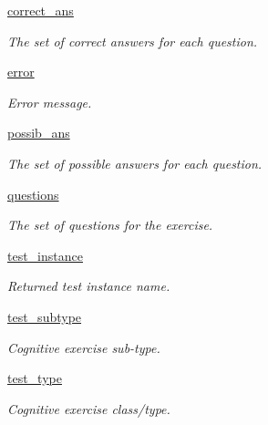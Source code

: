 \begin{DoxyCompactItemize}
\item 
\hyperlink{classRappCloud_1_1CloudMsgs_1_1CognitiveExerciseSelect_1_1CognitiveExerciseSelect_1_1Response_a167281ca5ae7322e9f3cd521ae172da3}{correct\-\_\-ans}
\begin{DoxyCompactList}\small\item\em The set of correct answers for each question. \end{DoxyCompactList}\item 
\hyperlink{classRappCloud_1_1CloudMsgs_1_1CognitiveExerciseSelect_1_1CognitiveExerciseSelect_1_1Response_a4678c5adecdd6d068ac0a5d8db9f0eb4}{error}
\begin{DoxyCompactList}\small\item\em Error message. \end{DoxyCompactList}\item 
\hyperlink{classRappCloud_1_1CloudMsgs_1_1CognitiveExerciseSelect_1_1CognitiveExerciseSelect_1_1Response_a961ae0ff8920eb42db94fdfb737fdb6f}{possib\-\_\-ans}
\begin{DoxyCompactList}\small\item\em The set of possible answers for each question. \end{DoxyCompactList}\item 
\hyperlink{classRappCloud_1_1CloudMsgs_1_1CognitiveExerciseSelect_1_1CognitiveExerciseSelect_1_1Response_adefa61c1a4386dd3b190fb01755156a9}{questions}
\begin{DoxyCompactList}\small\item\em The set of questions for the exercise. \end{DoxyCompactList}\item 
\hyperlink{classRappCloud_1_1CloudMsgs_1_1CognitiveExerciseSelect_1_1CognitiveExerciseSelect_1_1Response_a9e978c59f4c6a3640bdb9cb88a0cf1be}{test\-\_\-instance}
\begin{DoxyCompactList}\small\item\em Returned test instance name. \end{DoxyCompactList}\item 
\hyperlink{classRappCloud_1_1CloudMsgs_1_1CognitiveExerciseSelect_1_1CognitiveExerciseSelect_1_1Response_a996889b085f87874685d0bf402eba5b4}{test\-\_\-subtype}
\begin{DoxyCompactList}\small\item\em Cognitive exercise sub-\/type. \end{DoxyCompactList}\item 
\hyperlink{classRappCloud_1_1CloudMsgs_1_1CognitiveExerciseSelect_1_1CognitiveExerciseSelect_1_1Response_aeed0edf3b104e298ff51eaeb569cf337}{test\-\_\-type}
\begin{DoxyCompactList}\small\item\em Cognitive exercise class/type. \end{DoxyCompactList}\end{DoxyCompactItemize}


